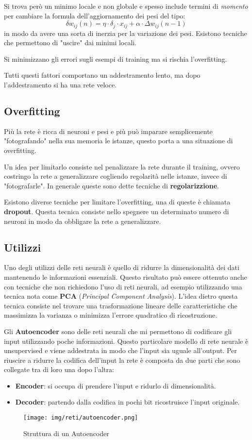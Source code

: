Si trova però un minimo locale e non globale e spesso include termini di \textit{momento} per cambiare la formula dell'aggiornamento dei pesi del tipo:
\begin{equation}
    \delta w_{ij}(n) = \eta \cdot \delta_j \cdot x_{ij} + \alpha \cdot \Delta w_{ij} (n - 1)
\end{equation}
in modo da avere una sorta di inerzia per la variazione dei pesi. Esistono tecniche che permettono di "uscire" dai minimi locali.

Si minimizzano gli errori sugli esempi di training ma si rischia l'overfitting.

Tutti questi fattori comportano un addestramento lento, ma dopo l'addestramento si ha una rete veloce. 
\subsection{Overfitting}
Più la rete è ricca di neuroni e pesi e più può imparare semplicemente "fotografando" nella sua memoria le istanze, questo porta a una situazione di overfitting.
  
Un idea per limitarlo consiste nel penalizzare la rete durante il training, ovvero costringo la rete a generalizzare cogliendo regolarità nelle istanze, invece di "fotografarle". In generale queste sono dette tecniche di \textbf{regolarizzione}.

Esistono diverse tecniche per limitare l'overfitting, una di queste è chiamata \textbf{dropout}. Questa tecnica consiste nello spegnere un determinato numero di neuroni in modo da obbligare la rete a generalizzare.
\subsection{Utilizzi}
Uno degli utilizzi delle reti neurali è quello di ridurre la dimensionalità dei dati mantenendo le informazioni essenziali. Questo risultato può essere ottenuto anche con tecniche che non richiedono l'uso di reti neurali, ad esempio utilizzando una tecnica nota come \textbf{PCA} (\textit{Principal Component Analysis}). L'idea dietro questa tecnica consiste nel trovare una trasformazione lineare delle caratteristiche che massimizza la varianza o minimizza l'errore quadratico di ricostruzione.

Gli \textbf{Autoencoder} sono delle reti neurali che mi permettono di codificare gli input utilizzando poche informazioni. Questo particolare modello di rete neurale è unsupervised e viene addestrata in modo che l'input sia uguale all'output. Per riuscire a ridurre la codifica dell'input la rete è composta da due parti che sono collegate tra di loro una dopo l'altra:
\begin{itemize}
    \item \textbf{Encoder}: si occupa di prendere l'input e ridurlo di dimensionalità.
    \item \textbf{Decoder}: partendo dalla codifica in pochi bit ricostruisce l'input originale.
\end{itemize}
\begin{figure}[!ht]
    \centering
    \texttt{[image: img/reti/autoencoder.png]}
    \caption{Struttura di un Autoencoder}
\end{figure}

